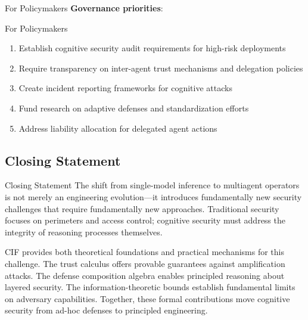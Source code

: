 \documentclass[
  ignorenonframetext,
]{beamer}
\begin{document}
\begin{frame}[allowframebreaks]{For Policymakers}
\protect{}\label{for-policymakers}
\textbf{Governance priorities}:

\end{frame}

\begin{frame}[allowframebreaks]{For Policymakers}
\begin{enumerate}
\item Establish cognitive security audit requirements for high-risk deployments
\item Require transparency on inter-agent trust mechanisms and delegation policies
\item Create incident reporting frameworks for cognitive attacks
\item Fund research on adaptive defenses and standardization efforts
\item Address liability allocation for delegated agent actions
\end{enumerate}
\end{frame}

\subsection{Closing Statement}\label{sec:closing}

\begin{frame}[allowframebreaks]{Closing Statement}
The shift from single-model inference to multiagent operators is not
merely an engineering evolution---it introduces fundamentally new
security challenges that require fundamentally new approaches.
Traditional security focuses on perimeters and access control; cognitive
security must address the integrity of reasoning processes themselves.

CIF provides both theoretical foundations and practical mechanisms for
this challenge. The trust calculus offers provable guarantees against
amplification attacks. The defense composition algebra enables
principled reasoning about layered security. The information-theoretic
bounds establish fundamental limits on adversary capabilities. Together,
these formal contributions move cognitive security from ad-hoc defenses
to principled engineering.

\end{frame}
\end{document}
